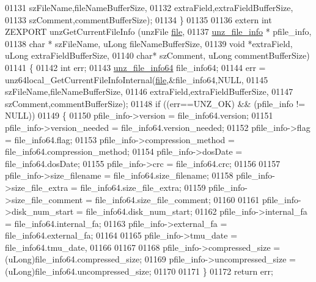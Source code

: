 \begin{DoxyCode}
01131                                                 szFileName,fileNameBufferSize,
01132                                                 extraField,extraFieldBufferSize,
01133                                                 szComment,commentBufferSize);
01134 \}
01135 
01136 \textcolor{keyword}{extern} \textcolor{keywordtype}{int} ZEXPORT unzGetCurrentFileInfo (unzFile \hyperlink{structfile}{file},
01137                                           \hyperlink{structunz__file__info__s}{unz\_file\_info} * pfile\_info,
01138                                           \textcolor{keywordtype}{char} * szFileName, uLong fileNameBufferSize,
01139                                           \textcolor{keywordtype}{void} *extraField, uLong extraFieldBufferSize,
01140                                           \textcolor{keywordtype}{char}* szComment,  uLong commentBufferSize)
01141 \{
01142     \textcolor{keywordtype}{int} err;
01143     \hyperlink{structunz__file__info64__s}{unz\_file\_info64} file\_info64;
01144     err = unz64local\_GetCurrentFileInfoInternal(\hyperlink{structfile}{file},&file\_info64,NULL,
01145                                                 szFileName,fileNameBufferSize,
01146                                                 extraField,extraFieldBufferSize,
01147                                                 szComment,commentBufferSize);
01148     \textcolor{keywordflow}{if} ((err==UNZ\_OK) && (pfile\_info != NULL))
01149     \{
01150         pfile\_info->version = file\_info64.version;
01151         pfile\_info->version\_needed = file\_info64.version\_needed;
01152         pfile\_info->flag = file\_info64.flag;
01153         pfile\_info->compression\_method = file\_info64.compression\_method;
01154         pfile\_info->dosDate = file\_info64.dosDate;
01155         pfile\_info->crc = file\_info64.crc;
01156 
01157         pfile\_info->size\_filename = file\_info64.size\_filename;
01158         pfile\_info->size\_file\_extra = file\_info64.size\_file\_extra;
01159         pfile\_info->size\_file\_comment = file\_info64.size\_file\_comment;
01160 
01161         pfile\_info->disk\_num\_start = file\_info64.disk\_num\_start;
01162         pfile\_info->internal\_fa = file\_info64.internal\_fa;
01163         pfile\_info->external\_fa = file\_info64.external\_fa;
01164 
01165         pfile\_info->tmu\_date = file\_info64.tmu\_date,
01166 
01167 
01168         pfile\_info->compressed\_size = (uLong)file\_info64.compressed\_size;
01169         pfile\_info->uncompressed\_size = (uLong)file\_info64.uncompressed\_size;
01170 
01171     \}
01172     \textcolor{keywordflow}{return} err;

\end{DoxyCode}
